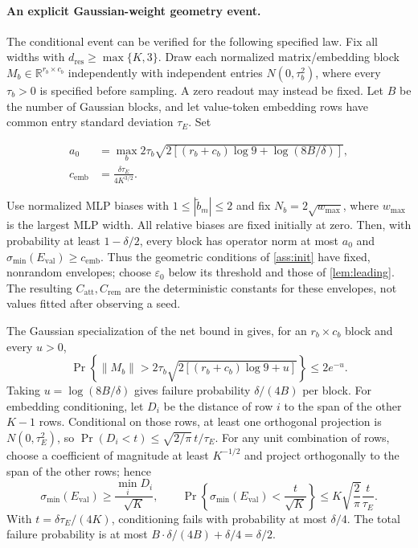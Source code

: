 \paragraph{An explicit Gaussian-weight geometry event.}
\label{app:t2-gaussian-geometry}
The conditional event can be verified for the following specified law.
Fix all widths with $d_{\mathrm{res}}\ge\max\{K,3\}$. Draw each normalized
matrix/embedding block $M_b\in\mathbb R^{r_b\times c_b}$ independently
with independent entries $N(0,\tau_b^2)$, where every $\tau_b>0$ is
specified before sampling. A zero readout may instead be fixed. Let $B$
be the number of Gaussian blocks, and let value-token embedding rows
have common entry standard deviation $\tau_E$. Set

\[
 \begin{aligned}
 a_0&=\max_b 2\tau_b\sqrt{2[(r_b+c_b)\log9+\log(8B/\delta)]},\\
 c_{\mathrm{emb}}&=\frac{\delta\tau_E}{4K^{3/2}}.
 \end{aligned}
\]

Use normalized MLP biases with $1\le|\tilde b_m|\le2$ and fix
$N_b=2\sqrt{w_{\max}}$, where $w_{\max}$ is the largest MLP width.
All relative biases are fixed initially at zero. Then, with probability
at least $1-\delta/2$, every block has operator norm at most $a_0$ and
$\sigma_{\min}(E_{\mathrm{val}})\ge c_{\mathrm{emb}}$. Thus the geometric
conditions of \cref{ass:init} have fixed, nonrandom envelopes; choose
$\varepsilon_0$ below its threshold and those of \cref{lem:leading}.
The resulting $C_{\mathrm{att}},C_{\mathrm{rem}}$ are the deterministic
constants for these envelopes, not values fitted after observing a seed.

The Gaussian specialization of the net bound in
\citet[Corollary~4.2.13 and proof of Theorem~4.4.5]{vershynin2018high}
gives, for an $r_b\times c_b$ block and every $u>0$,
\[
 \Pr\!\left\{\|M_b\|>
 2\tau_b\sqrt{2[(r_b+c_b)\log9+u]}\right\}\le2e^{-u}.
\]
Taking $u=\log(8B/\delta)$ gives failure probability $\delta/(4B)$ per block.
For embedding conditioning, let $D_i$ be the distance of
row $i$ to the span of the other $K-1$ rows. Conditional on those rows,
at least one orthogonal projection is $N(0,\tau_E^2)$, so
$\Pr(D_i<t)\le\sqrt{2/\pi}\,t/\tau_E$. For any unit combination of rows,
choose a coefficient of magnitude at least $K^{-1/2}$ and project
orthogonally to the span of the other rows; hence
\[
 \sigma_{\min}(E_{\mathrm{val}})\ge\frac{\min_iD_i}{\sqrt K},\qquad
 \Pr\!\left\{\sigma_{\min}(E_{\mathrm{val}})<\frac{t}{\sqrt K}\right\}
 \le K\sqrt{\frac2\pi}\frac{t}{\tau_E}.
\]
With $t=\delta\tau_E/(4K)$, conditioning fails with probability at most
$\delta/4$. The total failure probability is at most
$B\cdot\delta/(4B)+\delta/4=\delta/2$.

